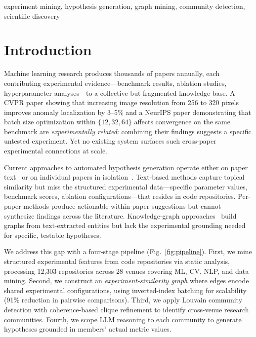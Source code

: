 \documentclass[conference]{IEEEtran}
\begin{document}
\begin{IEEEkeywords}
experiment mining, hypothesis generation, graph mining, community detection, scientific discovery
\end{IEEEkeywords}

\section{Introduction}

Machine learning research produces thousands of papers annually, each contributing experimental evidence---benchmark results, ablation studies, hyperparameter analyses---to a collective but fragmented knowledge base.
A CVPR paper showing that increasing image resolution from 256 to 320 pixels improves anomaly localization by 3--5\% and a NeurIPS paper demonstrating that batch size optimization within $\{12, 32, 64\}$ affects convergence on the same benchmark are \emph{experimentally related}: combining their findings suggests a specific untested experiment.
Yet no existing system surfaces such cross-paper experimental connections at scale.

Current approaches to automated hypothesis generation operate either on paper text~\cite{si2024llmideas, radensky2025scideator, lu2024aiscientist} or on individual papers in isolation~\cite{abramovich2025ablationbench, zhao2025abgen}.
Text-based methods capture topical similarity but miss the structured experimental data---specific parameter values, benchmark scores, ablation configurations---that resides in code repositories.
Per-paper methods produce actionable within-paper suggestions but cannot synthesize findings across the literature.
Knowledge-graph approaches~\cite{xiong2024kgcoi, ghafarollahi2024sciagents} build graphs from text-extracted entities but lack the experimental grounding needed for specific, testable hypotheses.

We address this gap with a four-stage pipeline (Fig.~\ref{fig:pipeline}).
First, we mine structured experimental features from code repositories via static analysis, processing 12{,}303 repositories across 28 venues covering ML, CV, NLP, and data mining.
Second, we construct an \emph{experiment-similarity graph} where edges encode shared experimental configurations, using inverted-index batching for scalability (91\% reduction in pairwise comparisons).
Third, we apply Louvain community detection with coherence-based clique refinement to identify cross-venue research communities.
Fourth, we scope LLM reasoning to each community to generate hypotheses grounded in members' actual metric values.
\end{document}
